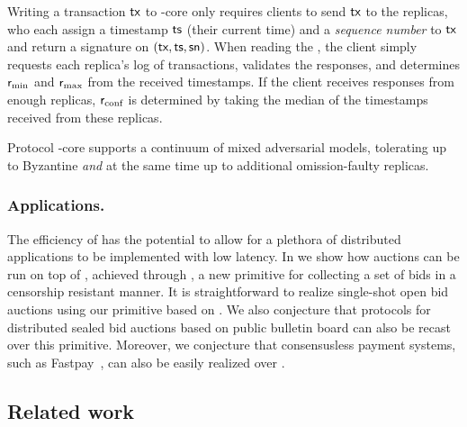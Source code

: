 Writing a transaction $\textsf{tx}$ to \podtm-core only requires clients to send $\textsf{tx}$ to the replicas, who each assign a timestamp $\textsf{ts}$ (their current time) and a \emph{sequence number} \sn to $\textsf{tx}$ and return a signature on $(\textsf{tx},\textsf{ts}, \textsf{sn})$. When reading the \podtm, the client simply requests each replica's log of transactions, validates the responses, and determines $\textsf{r}_\text{min}$ and $\textsf{r}_\text{max}$ from the received timestamps. If the client receives responses from enough replicas, $\textsf{r}_\text{conf}$ is determined by taking the median of the timestamps received from these replicas.

Protocol \podtm-core supports a continuum of mixed adversarial models, tolerating up to \beta Byzantine \emph{and} at the same time up to \gamma additional omission-faulty replicas.

\subsubsection{Applications.}
The efficiency of \podtm has the potential to allow for a plethora of distributed applications to be implemented with low latency. In  we show how auctions can be run on top of \podtm, achieved through \bidsettm, a new primitive for collecting a set of bids in a censorship resistant manner. It is straightforward to realize single-shot open bid auctions using our \bidsettm primitive based on \podtm. We also conjecture that protocols for distributed sealed bid auctions based on public bulletin board can also be recast over this primitive. Moreover, we conjecture that consensusless payment systems, such as Fastpay~\cite{DBLP:conf/aft/BaudetDS20}, can also be easily realized over \podtm.



\subsection{Related work}\label{app:related}

